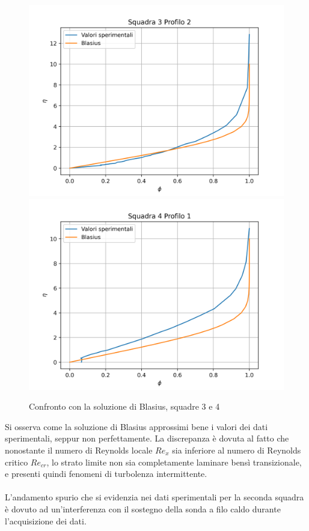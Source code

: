 \begin{figure}[H]
    \centering
    \includegraphics[width=.49\textwidth]{images/9/sq3p2_blasius.png}
    \includegraphics[width=.49\textwidth]{images/9/sq4p1_blasius.png}
    \caption{Confronto con la soluzione di Blasius, squadre 3 e 4}
\end{figure}

\noindent Si osserva come la soluzione di Blasius approssimi bene i valori dei dati sperimentali, seppur non perfettamente. La discrepanza è dovuta al fatto che nonostante il numero di Reynolds locale $Re_x$ sia inferiore al numero di Reynolds critico $Re_{cr}$, lo strato limite non sia completamente laminare bensì transizionale, e presenti quindi fenomeni di turbolenza intermittente.\\\\
L'andamento spurio che si evidenzia nei dati sperimentali per la seconda squadra è dovuto ad un'interferenza con il sostegno della sonda a filo caldo durante l'acquisizione dei dati.




